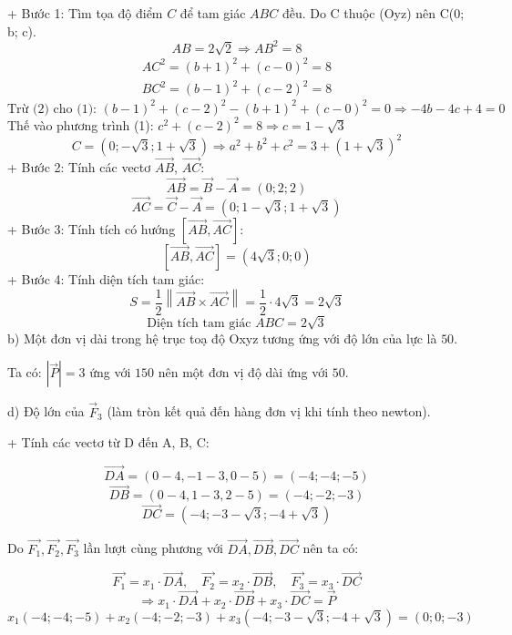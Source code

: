 \documentclass[a4paper,12pt]{article}
\begin{document}
+ Bước 1: Tìm tọa độ điểm \(C\) để tam giác \(ABC\) đều.
Do C thuộc (Oyz) nên C(0; b; c).
\[ AB = 2 \sqrt{2} \Rightarrow AB^2 = 8 \]
\begin{align}
AC^2 = (b +1)^2 + (c - 0)^2 = 8 \tag{1} \\
BC^2 = (b - 1)^2 + (c - 2)^2 = 8 \tag{2}
\end{align}
\[\text{Trừ (2) cho (1): }(b - 1)^2 + (c - 2)^2 - (b + 1)^2 + (c - 0)^2 = 0 \Rightarrow - 4 b - 4 c + 4 = 0\]
Thế vào phương trình (1): \(c^{2} + \left(c - 2\right)^{2} = 8 \Rightarrow c=1 - \sqrt{3}\)
\[C = (0; - \sqrt{3}; 1 + \sqrt{3}) \Rightarrow a^2+b^2+c^2=3 + \left(1 + \sqrt{3}\right)^{2}\]
+ Bước 2: Tính các vectơ \(\overrightarrow{AB}\), \(\overrightarrow{AC}\):
\[ \overrightarrow{AB} = \overrightarrow{B} - \overrightarrow{A} = (0; 2; 2) \]
\[ \overrightarrow{AC} = \overrightarrow{C} - \overrightarrow{A} = (0; 1 - \sqrt{3}; 1 + \sqrt{3}) \]
+ Bước 3: Tính tích có hướng \(\left[\overrightarrow{AB}, \overrightarrow{AC}\right]\):
\[ [\overrightarrow{AB},  \overrightarrow{AC}] = (4 \sqrt{3}; 0; 0) \]
+ Bước 4: Tính diện tích tam giác:
\[
S = \frac{1}{2} \left\| \overrightarrow{AB} \times \overrightarrow{AC} \right\| = \frac{1}{2} \cdot 4 \sqrt{3}
= 2 \sqrt{3}
\]
\[\text{Diện tích tam giác } ABC = 2 \sqrt{3}\]
b) Một đơn vị dài trong hệ trục toạ độ Oxyz tương ứng với độ lớn của lực là \(50\).


Ta có: \(|\overrightarrow{P}| = 3\) ứng với \(150\) nên một đơn vị độ dài ứng với \(50\).




d) Độ lớn của \(\overrightarrow{F}_3\) (làm tròn kết quả đến hàng đơn vị khi tính theo newton).


+ Tính các vectơ từ D đến A, B, C:


\[ \overrightarrow{DA} = (0 - 4, -1 - 3, 0 - 5) = (-4; -4; -5) \]
\[ \overrightarrow{DB} = (0 - 4, 1 - 3, 2 - 5) = (-4; -2; -3) \]
\[ \overrightarrow{DC} = (-4; -3 - \sqrt{3}; -4 + \sqrt{3}) \]


Do \(\overrightarrow{F_1},\overrightarrow{F_2}, \overrightarrow{F_3}\) lần lượt cùng phương với \(\overrightarrow{DA}, \overrightarrow{DB}, \overrightarrow{DC}\) nên ta có:


\[ \overrightarrow{F_1} = x_1 \cdot \overrightarrow{DA},\quad \overrightarrow{F_2} = x_2 \cdot \overrightarrow{DB},\quad \overrightarrow{F_3} = x_3 \cdot \overrightarrow{DC} \]
\[ \Rightarrow x_1 \cdot \overrightarrow{DA} + x_2 \cdot \overrightarrow{DB} + x_3 \cdot \overrightarrow{DC} = \overrightarrow{P} \]
\[ x_1(-4; -4; -5) + x_2(-4; -2; -3) + x_3(-4; -3 - \sqrt{3}; -4 + \sqrt{3}) = (0; 0; -3) \]
\end{document}
